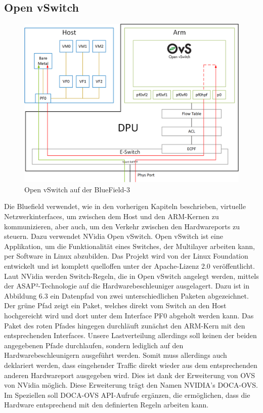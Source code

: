 \subsection{Open vSwitch}
\begin{figure}
    \centering
    \includegraphics[width=0.85\linewidth]{images/kernel_representors_model.png}
    \caption{Open vSwitch auf der BlueField-3}
    \label{fig:enter-label}
\end{figure}
Die Bluefield verwendet, wie in den vorherigen Kapiteln beschrieben, virtuelle Netzwerkinterfaces, um zwischen dem Host und den ARM-Kernen zu kommunizieren, aber auch, um den Verkehr zwischen den Hardwareports zu steuern. Dazu verwendet NVidia Open vSwitch. Open vSwitch ist eine Applikation, um die Funktionalität eines Switches, der Multilayer arbeiten kann, per Software in Linux abzubilden. Das Projekt wird von der Linux Foundation entwickelt und ist komplett quelloffen unter der Apache-Lizenz 2.0 veröffentlicht. Laut NVidia werden Switch-Regeln, die in Open vSwitch angelegt werden, mittels der ASAP²-Technologie auf die Hardwarebeschleuniger ausgelagert. Dazu ist in Abbildung 6.3 ein Datenpfad von zwei unterschiedlichen Paketen abgezeichnet. Der grüne Pfad zeigt ein Paket, welches direkt vom Switch an den Host hochgereicht wird und dort unter dem Interface PF0 abgeholt werden kann. Das Paket des roten Pfades hingegen durchläuft zunächst den ARM-Kern mit den entsprechenden Interfaces. Unsere Lastverteilung allerdings soll keinen der beiden angegebenen Pfade durchlaufen, sondern lediglich auf den Hardwarebeschleunigern ausgeführt werden. Somit muss allerdings auch deklariert werden, dass eingehender Traffic direkt wieder aus dem entsprechenden anderen Hardwareport ausgegeben wird. Dies ist dank der Erweiterung von OVS von NVidia möglich. Diese Erweiterung trägt den Namen NVIDIA's DOCA-OVS. Im Speziellen soll DOCA-OVS API-Aufrufe ergänzen, die ermöglichen, dass die Hardware entsprechend mit den definierten Regeln arbeiten kann.
